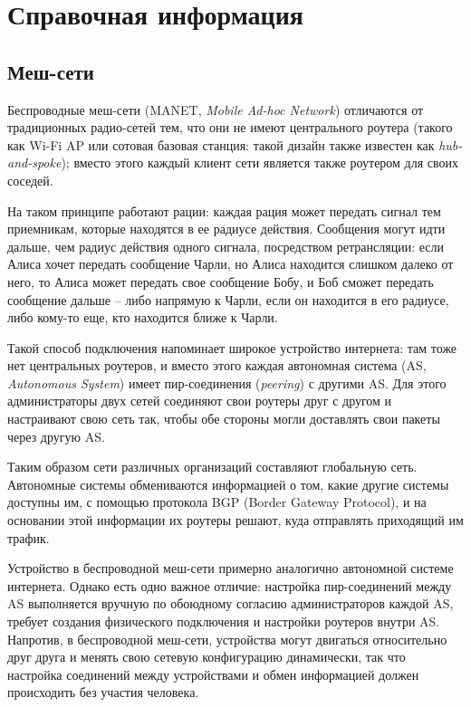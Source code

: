 \documentclass[%
]{report}
\begin{document}
\section*{Справочная информация}


\subsection*{Меш-сети}
Беспроводные меш-сети (MANET, \emph{Mobile Ad-hoc Network})
отличаются от традиционных радио-сетей тем,
что они не имеют центрального роутера (такого как Wi-Fi AP или сотовая базовая станция: такой дизайн также известен как \emph{hub-and-spoke});
вместо этого каждый клиент сети является также роутером для своих соседей.

На таком принципе работают рации:
каждая рация может передать сигнал тем приемникам, которые находятся в ее радиусе действия.
Сообщения могут идти дальше, чем радиус действия одного сигнала,
посредством ретрансляции:
если Алиса хочет передать сообщение Чарли,
но Алиса находится слишком далеко от него,
то Алиса может передать свое сообщение Бобу,
и Боб сможет передать сообщение дальше --
либо напрямую к Чарли, если он находится в его радиусе,
либо кому-то еще, кто находится ближе к Чарли.

Такой способ подключения напоминает широкое устройство интернета:
там тоже нет центральных роутеров,
и вместо этого каждая автономная система (AS, \emph{Autonomous System})
имеет пир-соединения (\emph{peering}) с другими AS.
Для этого администраторы двух сетей
соединяют свои роутеры друг с другом
и настраивают свою сеть так, чтобы обе стороны
могли доставлять свои пакеты через другую AS.

Таким образом сети различных организаций составляют глобальную сеть.
Автономные системы обмениваются информацией о том, какие другие системы доступны им,
с помощью протокола BGP (Border Gateway Protocol),
и на основании этой информации их роутеры решают, куда отправлять приходящий им трафик.

Устройство в беспроводной меш-сети примерно аналогично автономной системе интернета.
Однако есть одно важное отличие:
настройка пир-соединений между AS выполняется вручную
по обоюдному согласию администраторов каждой AS,
требует создания физического подключения
и настройки роутеров внутри AS.
Напротив, в беспроводной меш-сети,
устройства могут двигаться относительно друг друга и менять свою сетевую конфигурацию динамически,
так что настройка соединений между устройствами и обмен информацией
должен происходить без участия человека.
\end{document}
